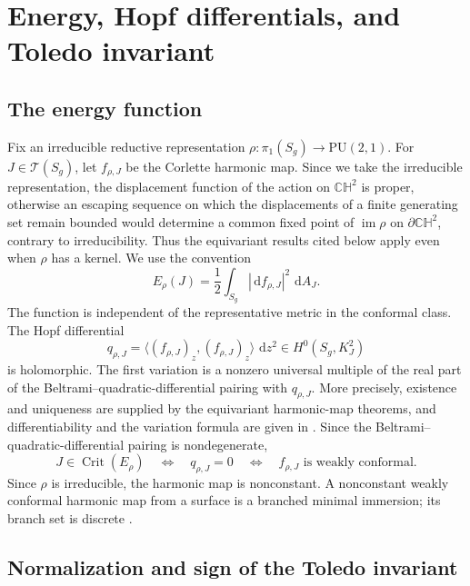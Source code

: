 \documentclass[12pt]{amsart}
\theoremstyle{remark}
\newcommand{\CH}{\mathbb{CH}}
\newcommand{\Teich}{\mathcal T}
\newcommand{\PU}{\mathrm{PU}}
\newcommand{\im}{\operatorname{im}}
\newcommand{\dd}{\,\mathrm d}
\begin{document}
\section{Energy, Hopf differentials, and Toledo invariant}

\subsection{The energy function}

Fix an irreducible reductive representation
$\rho:\pi_1(S_g)\to\PU(2,1)$.  For $J\in\Teich(S_g)$, let $f_{\rho,J}$ be
the Corlette harmonic map.  Since we take the irreducible representation, the displacement function of the action on
$\CH^2$ is proper, otherwise an escaping sequence on which the displacements
of a finite generating set remain bounded would determine a common fixed
point of $\im\rho$ on $\partial\CH^2$, contrary to irreducibility.  Thus the
equivariant results cited below apply even when $\rho$ has a kernel.  We use
the convention
\[
 E_\rho(J)=\frac12\int_{S_g}|\dd f_{\rho,J}|^2\,\dd A_J.
\]
The function is independent of the representative metric in the conformal
class.  The Hopf differential
\[
 q_{\rho,J}=\big\langle (f_{\rho,J})_z,(f_{\rho,J})_z\big\rangle\,\dd z^2
 \in H^0(S_g,K_J^2)
\]
is holomorphic.  The first variation is a nonzero universal multiple of the
real part of the Beltrami--quadratic-differential pairing with $q_{\rho,J}$.
More precisely, existence and uniqueness are supplied by the equivariant
harmonic-map theorems, and differentiability and the variation formula are
given in \cite[Theorems~3.2, 3.4, and~3.11]{DaskalopoulosWentworth}.
Since the Beltrami--quadratic-differential pairing is nondegenerate,
\begin{equation}\label{eq:critical-equivalence}
 J\in\operatorname{Crit}(E_\rho)
 \quad\Longleftrightarrow\quad q_{\rho,J}=0
 \quad\Longleftrightarrow\quad f_{\rho,J}
 \text{ is weakly conformal}.
\end{equation}
Since $\rho$ is irreducible, the harmonic map is nonconstant.  A nonconstant
weakly conformal harmonic map from a surface is a branched minimal immersion;
its branch set is discrete
\cite[Propositions~2.2 and~2.4]{GulliverOssermanRoyden}.

\subsection{Normalization and sign of the Toledo invariant}
\end{document}
